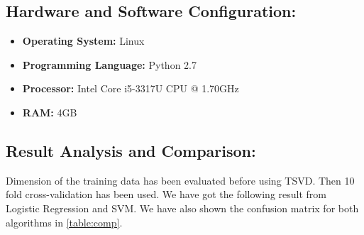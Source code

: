 \documentclass[10pt, conference]{IEEEtran}
\begin{document}
	\subsection{\textbf{Hardware and Software Configuration:}}
	\begin{itemize}
		\item \textbf{Operating System:} Linux
		\item \textbf{Programming Language:} Python 2.7
		\item \textbf{Processor:} Intel Core i5-3317U CPU @ 1.70GHz 
		\item \textbf{RAM:} 4GB
	\end{itemize}
	
	\subsection{\textbf{Result Analysis and Comparison:}} Dimension of the training data has been evaluated before using TSVD. Then 10 fold cross-validation has been used. We have got the following result from Logistic Regression and SVM. We have also shown the confusion matrix for both algorithms in \ref{table:comp}. 
	
\end{document}
